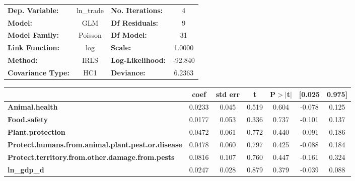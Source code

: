 \begin{center}
\begin{tabular}{lclc}
\toprule
\textbf{Dep. Variable:}                                   &   ln\_trade   & \textbf{  No. Iterations:    } &     4       \\
\textbf{Model:}                                           &      GLM      & \textbf{  Df Residuals:      } &     9       \\
\textbf{Model Family:}                                    &    Poisson    & \textbf{  Df Model:          } &     31      \\
\textbf{Link Function:}                                   &      log      & \textbf{  Scale:             } &    1.0000   \\
\textbf{Method:}                                          &      IRLS     & \textbf{  Log-Likelihood:    } &   -92.840   \\
\textbf{Covariance Type:}                                 &      HC1      & \textbf{  Deviance:          } &    6.2363   \\
\bottomrule
\end{tabular}
\begin{tabular}{lcccccc}
                                                          & \textbf{coef} & \textbf{std err} & \textbf{t} & \textbf{P$> |$t$|$} & \textbf{[0.025} & \textbf{0.975]}  \\
\midrule
\textbf{Animal.health}                                    &       0.0233  &        0.045     &     0.519  &         0.604        &       -0.078    &        0.125     \\
\textbf{Food.safety}                                      &       0.0177  &        0.053     &     0.336  &         0.737        &       -0.101    &        0.137     \\
\textbf{Plant.protection}                                 &       0.0472  &        0.061     &     0.772  &         0.440        &       -0.091    &        0.186     \\
\textbf{Protect.humans.from.animal.plant.pest.or.disease} &       0.0478  &        0.060     &     0.797  &         0.425        &       -0.088    &        0.184     \\
\textbf{Protect.territory.from.other.damage.from.pests}   &       0.0816  &        0.107     &     0.760  &         0.447        &       -0.161    &        0.324     \\
\textbf{ln\_gdp\_d}                                       &       0.0247  &        0.028     &     0.879  &         0.379        &       -0.039    &        0.088     \\

\end{tabular}
\end{center}

